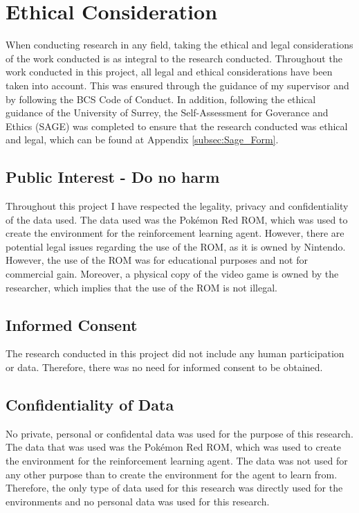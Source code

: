 \section{Ethical Consideration}

When conducting research in any field, taking the ethical and legal considerations of the work conducted is as integral to the research conducted. Throughout the work conducted in this project, all legal and ethical considerations have been taken into account. This was ensured through the guidance of my supervisor and by following the BCS Code of Conduct. In addition, following the ethical guidance of the University of Surrey, the Self-Assessment for Goverance and Ethics (SAGE) was completed to ensure that the research conducted was ethical and legal, which can be found at Appendix 
\ref{subsec:Sage_Form}.


\subsection{Public Interest - Do no harm}

Throughout this project I have respected the legality, privacy and confidentiality of the data used. The data used was the Pokémon Red ROM, which was used to create the environment for the reinforcement learning agent. However, there are potential legal issues regarding the use of the ROM, as it is owned by Nintendo. However, the use of the ROM was for educational purposes and not for commercial gain. Moreover, a physical copy of the video game is owned by the researcher, which implies that the use of the ROM is not illegal.

\subsection{Informed Consent}

The research conducted in this project did not include any human participation or data. Therefore, there was no need for informed consent to be obtained.

\subsection{Confidentiality of Data}

No private, personal or confidental data was used for the purpose of this research. The data that was used was the Pokémon Red ROM, which was used to create the environment for the reinforcement learning agent. The data was not used for any other purpose than to create the environment for the agent to learn from. Therefore, the only type of data used for this research was directly used for the environments and no personal data was used for this research.

